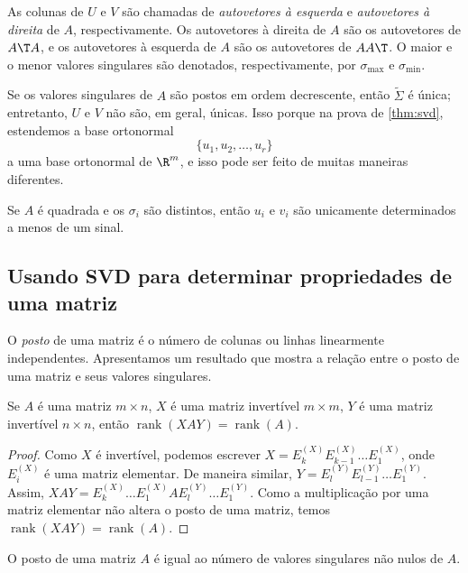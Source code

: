 \documentclass{article}
\DeclareMathOperator{\rank}{rank}
\begin{document}
As colunas de \(U\) e \(V\) são chamadas de \emph{autovetores à esquerda} e \emph{autovetores à direita} de \(A\), respectivamente. Os autovetores à direita de \(A\) são os autovetores de \(A\T A\), e os autovetores à esquerda de \(A\) são os autovetores de \(AA\T \). O maior e o menor valores singulares são denotados, respectivamente, por \(\sigma_{\max}\) e \(\sigma_{\min}\).

Se os valores singulares de \(A\) são postos em ordem decrescente, então \(\tilde{\Sigma}\) é única; entretanto, \(U\) e \(V\) não são, em geral, únicas. Isso porque na prova de \ref{thm:svd}, estendemos a base ortonormal 
\[
    \{u_1, u_2, \ldots, u_r\}
\] a uma base ortonormal de \(\R^m\), e isso pode ser feito de muitas maneiras diferentes.

\begin{rem}
    Se \(A\) é quadrada e os \(\sigma_i\) são distintos, então \(u_i\) e \(v_i\) são unicamente determinados a menos de um sinal.
\end{rem}

\subsection{Usando SVD para determinar propriedades de uma matriz}

O \emph{posto} de uma matriz é o número de colunas ou linhas linearmente independentes. Apresentamos um resultado que mostra a relação entre o posto de uma matriz e seus valores singulares.

\begin{prop}
    Se \(A\) é uma matriz \(m \times n\), \(X\) é uma matriz invertível \(m \times m\), \(Y\) é uma matriz invertível \(n \times n\), então \(\rank(XAY) = \rank(A)\).
\end{prop}

\begin{proof}
    Como \(X\) é invertível, podemos escrever \(X = E_k^{(X)} E_{k-1}^{(X)} \ldots E_1^{(X)}\), onde \(E_i^{(X)}\) é uma matriz elementar. De maneira similar, \(Y = E_l^{(Y)} E_{l-1}^{(Y)} \ldots E_1^{(Y)}\). Assim, \(XAY = E_k^{(X)} \ldots E_1^{(X)} A E_l^{(Y)} \ldots E_1^{(Y)}\). Como a multiplicação por uma matriz elementar não altera o posto de uma matriz, temos \(\rank(XAY) = \rank(A)\).
\end{proof}

\begin{prop}
    O posto de uma matriz \(A\) é igual ao número de valores singulares não nulos de \(A\).
\end{prop}
\end{document}
